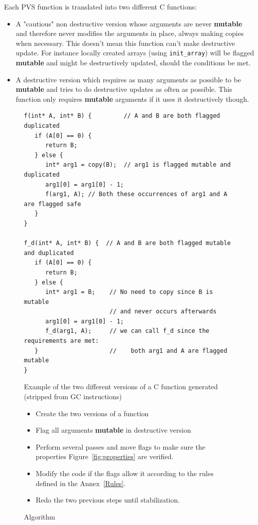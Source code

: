\documentclass[12pt,a4paper,titlepage]{article}
\newcommand{\cl}[1]{\texttt{#1}}
\newcommand{\bang}{ \textbf{ mutable } }
\begin{document}
Each PVS function is translated into two different C functions:
\begin{itemize}
\item A "cautious" non destructive version whose arguments are never \bang and therefore never modifies the arguments in place, always making copies when necessary. This doesn't mean this function can't make destructive update. For instance locally created arrays (using \cl{init\_array}) will be flagged \bang and might be destructively updated, should the conditions be met.
\item A destructive version which requires as many arguments as possible to be \bang and tries to do destructive updates as often as possible. This function only requires \bang arguments if it uses it destructively though.
\end{itemize}


\begin{figure}
\begin{lstlisting}
f(int* A, int* B) {         // A and B are both flagged duplicated
   if (A[0] == 0) {
      return B;
   } else {
      int* arg1 = copy(B);  // arg1 is flagged mutable and duplicated
      arg1[0] = arg1[0] - 1;
      f(arg1, A); // Both these occurrences of arg1 and A are flagged safe
   }
}

f_d(int* A, int* B) {  // A and B are both flagged mutable and duplicated
   if (A[0] == 0) {
      return B;
   } else {
      int* arg1 = B;    // No need to copy since B is mutable
                        // and never occurs afterwards
      arg1[0] = arg1[0] - 1;
      f_d(arg1, A);     // we can call f_d since the requirements are met:
   }                    //    both arg1 and A are flagged mutable
}
\end{lstlisting}
\caption{Example of the two different versions of a C function generated (stripped from GC instructions)}
\end{figure}




\begin{figure}
\begin{itemize}
\item Create the two versions of a function
\item Flag all arguments \bang in destructive version
\item Perform several passes and move flags to make sure the properties Figure~\ref{fig:properties} are verified.
\item Modify the code if the flags allow it according to the rules defined in the Annex~\ref{Rules}.
\item Redo the two previous steps until stabilization.
\end{itemize}
\caption{Algorithm}
\end{figure}
\end{document}
